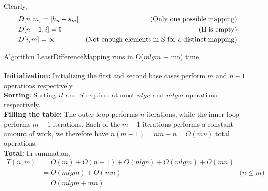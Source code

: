 \documentclass[12pt]{article}
\newenvironment{lemma}[2][Lemma]{\begin{trivlist}
\item[\hskip \labelsep {\bfseries #1}\hskip \labelsep {\bfseries #2.}]}{\end{trivlist}}
\newenvironment{question}[2][Question]{\begin{trivlist}
\item[\hskip \labelsep {\bfseries #1}\hskip \labelsep {\bfseries #2.}]}{\end{trivlist}}
\DeclarePairedDelimiter\abs{\lvert}{\rvert}%
\begin{document}
\begin{question}{2 (b)}
\begin{lemma}{2.1}
    Clearly,
    \begin{align*}
      & D[n, m] = \abs{h_{n} - s_{m}} & \text{(Only one possible mapping)} \\
      & D[n + 1, i] = 0 & \text{(H is empty)} \\
      & D[i, m] = \infty & \text{(Not enough elements in S for a distinct mapping)}
    \end{align*}
  \end{lemma}

  \begin{lemma}{2.2} Algorithm LeastDifferenceMapping runs in O($mlgm$ + mn) time
    \leavevmode \\ \\
    \textbf{Initialization:} Initializing the first and second base cases perform
    $m$ and $n - 1$ operations respectively. \\

    \textbf{Sorting:} Sorting $H$ and $S$ requires at most $nlgn$ and $mlgm$ operations
    respectively. \\

    \textbf{Filling the table:} The outer loop performs $n$ iterations, while the
    inner loop performs $m-1$ iterations.  Each of the $m-1$ iterations performs
    a constant amount of work, we therefore have $n(m-1) = nm - n = O(mn)$ total operations. \\

    \textbf{Total:} In summation,
    \begin{align*}
      T(n, m) & = O(m) + O(n - 1) + O(nlgn) + O(mlgm) + O(mn) & \\
           & = O(mlgm) + O(mn) & \text{($n \leq m$)} \\
           & = O(mlgm + mn) & \\
    \end{align*}
  \end{lemma}
\end{question}
\end{document}
